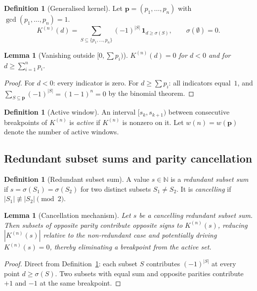 \documentclass[11pt,a4paper]{amsart}
\theoremstyle{plain}
\newtheorem{lemma}[theorem]{Lemma}
\theoremstyle{definition}
\newtheorem{definition}[theorem]{Definition}
\theoremstyle{remark}
\begin{document}
\begin{definition}[Generalised kernel]
\label{def:K-general}
Let $\mathbf{p} = (p_1, \ldots, p_n)$ with $\gcd(p_1,\ldots,p_n) = 1$.
\[
  K^{(n)}(d) = \sum_{S \subseteq \{p_1,\ldots,p_n\}} (-1)^{|S|}\,
               \mathbf{1}_{d \geq \sigma(S)}, \qquad
  \sigma(\emptyset) = 0.
\]
\end{definition}

\begin{lemma}[Vanishing outside $[0, \sum p_i)$]
\label{lem:K-vanish}
$K^{(n)}(d) = 0$ for $d < 0$ and for $d \geq \sum_{i=1}^n p_i$.
\end{lemma}

\begin{proof}
For $d < 0$: every indicator is zero.
For $d \geq \sum p_i$: all indicators equal~$1$, and
$\sum_{S \subseteq \mathbf{p}} (-1)^{|S|} = (1-1)^n = 0$
by the binomial theorem.
\end{proof}

\begin{definition}[Active window]
\label{def:active}
An interval $[s_k, s_{k+1})$ between consecutive breakpoints of $K^{(n)}$
is \emph{active} if $K^{(n)}$ is nonzero on it.
Let $w(n) = w(\mathbf{p})$ denote the number of active windows.
\end{definition}

\subsection{Redundant subset sums and parity cancellation}

\begin{definition}[Redundant subset sum]
\label{def:redundant}
A value $s \in \mathbb{N}$ is a \emph{redundant subset sum} if
$s = \sigma(S_1) = \sigma(S_2)$ for two distinct subsets $S_1 \neq S_2$.
It is \emph{cancelling} if $|S_1| \not\equiv |S_2| \pmod{2}$.
\end{definition}

\begin{lemma}[Cancellation mechanism]
\label{lem:cancel}
Let $s$ be a cancelling redundant subset sum. Then subsets of opposite
parity contribute opposite signs to $K^{(n)}(s)$, reducing
$|K^{(n)}(s)|$ relative to the non-redundant case and potentially
driving $K^{(n)}(s) = 0$, thereby eliminating a breakpoint from
the active set.
\end{lemma}

\begin{proof}
Direct from Definition~\ref{def:K-general}: each subset $S$ contributes
$(-1)^{|S|}$ at every point $d \geq \sigma(S)$. Two subsets with equal
sum and opposite parities contribute $+1$ and $-1$ at the same breakpoint.
\end{proof}
\end{document}
